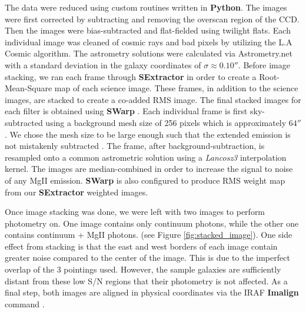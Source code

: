 \documentclass[twocolumn]{aastex6}
\begin{document}
The data were reduced using custom routines written in \textbf{Python}. 
The images were first corrected by subtracting and removing the overscan region of the CCD. 
Then the images were bias-subtracted and flat-fielded using twilight flats. 
Each individual image was cleaned of cosmic rays and bad pixels by utilizing the L.A Cosmic algorithm.
 The astrometry solutions were calculated via Astrometry.net \citep{Lang} with a standard deviation in the galaxy coordinates of $\sigma \approx 0.10''$. 
Before image stacking, we ran each frame through \textbf{SExtractor} \citep{Bertin} in order to create a Root-Mean-Square map of each science image.
 These frames, in addition to the science images, are stacked to create a co-added RMS image.
The final stacked images for each filter is obtained using \textbf{SWarp} \citep{Bertin}.
Each individual frame is first sky-subtracted using a background mesh size of 256 pixels which is approximately $64''$. 
We chose the mesh size to be large enough such that the extended emission is not mistakenly subtracted \citep{Battaia_2015}. 
The frame, after background-subtraction, is resampled onto a common astrometric solution using a \textit{Lancosz3} interpolation kernel. 
The images are median-combined in order to increase the signal to noise of any MgII emission. \textbf{SWarp} is also configured to produce RMS weight map from our \textbf{SExtractor} weighted images.

Once image stacking was done, we were left with two images to perform photometry on. One image contains only continuum photons, while the other one contains continuum + MgII photons.  (see Figure \ref{fig:stacked_image}). One side effect from stacking is that the east and west borders of each image contain greater noise compared to the center of the image. This is due to the imperfect overlap of the 3 pointings used. However, the sample galaxies are sufficiently distant from these low S/N regions that their photometry is not affected. As a final step, both images are aligned in physical coordinates via the IRAF \textbf{Imalign} command \citep{Tody_1986}.
\end{document}
